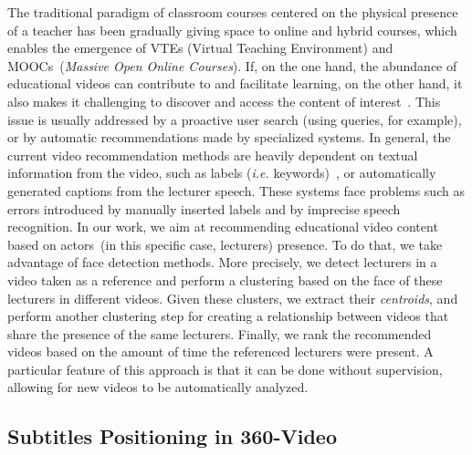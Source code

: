 The traditional paradigm of classroom courses centered on the physical presence of a teacher has been gradually giving space to online and hybrid courses, which enables the emergence of VTEs (Virtual Teaching Environment) and MOOCs~(\textit{Massive Open Online Courses}).
If, on the one hand, the abundance of educational videos can contribute to and facilitate learning, on the other hand, it also makes it challenging to discover and access the content of interest~\cite{dias2017approach}.
This issue is usually addressed by a proactive user search (using queries, for example), or by automatic recommendations made by specialized systems.
In general, the current video recommendation methods are heavily dependent on textual information from the video, such as labels (\textit{i.e.} keywords)~\cite{mahajan2015optimising,omisore2014personalized}, or automatically generated captions \cite{barrere2020utilizaccao} from the lecturer speech.
These systems face problems such as errors introduced by manually inserted labels and by imprecise speech recognition.
In our work, we aim at recommending educational video content based on actors~(in this specific case, lecturers) presence.
To do that, we take advantage of face detection methods.
More precisely, we detect lecturers in a video taken as a reference and perform a clustering based on the face of these lecturers in different videos.
Given these clusters, we extract their \textit{centroids}, and perform another clustering step for creating a relationship between videos that share the presence of the same lecturers.
Finally, we rank the recommended videos based on the amount of time the referenced lecturers were present.
A particular feature of this approach is that it can be done without supervision, allowing for new videos to be automatically analyzed.

\subsection{Subtitles Positioning in 360-Video}

